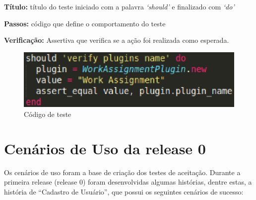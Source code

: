 \textbf{Título:} título do teste iniciado com a palavra \textit{‘should’} e finalizado com \textit{‘do’}

\textbf{Passos:} código que define o comportamento do teste

\textbf{Verificação:} Assertiva que verifica se a ação foi realizada como esperada.

\begin{figure}[!h]
    \centering
    \includegraphics[keepaspectratio=true,scale=0.55]
      {figuras/teste_should.eps}
    \caption{Código de teste}
    \label{noosfero_should}
\end{figure}

\section{Cenários de Uso da release 0}
\label{cenario_uso}
    Os cenários de uso foram a base de criação dos testes de aceitação.
    Durante a primeira release (release 0) foram desenvolvidas algumas histórias, dentre estas, a história de ``Cadastro de Usuário'', que possui os seguintes cenários de sucesso:

